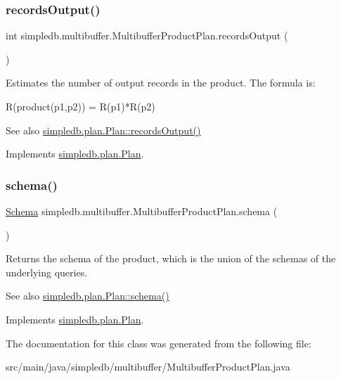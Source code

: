 \subsubsection{\texorpdfstring{records\+Output()}{recordsOutput()}}
{\footnotesize\ttfamily int simpledb.\+multibuffer.\+Multibuffer\+Product\+Plan.\+records\+Output (\begin{DoxyParamCaption}{ }\end{DoxyParamCaption})\hspace{0.3cm}{\ttfamily [inline]}}

Estimates the number of output records in the product. The formula is\+: 
\begin{DoxyPre} R(product(p1,p2)) = R(p1)*R(p2) \end{DoxyPre}
 \begin{DoxySeeAlso}{See also}
\hyperlink{interfacesimpledb_1_1plan_1_1Plan_a187e06657d356c80a7f743d7ff8fd257}{simpledb.\+plan.\+Plan\+::records\+Output()} 
\end{DoxySeeAlso}


Implements \hyperlink{interfacesimpledb_1_1plan_1_1Plan_a187e06657d356c80a7f743d7ff8fd257}{simpledb.\+plan.\+Plan}.

\mbox{\label{classsimpledb_1_1multibuffer_1_1MultibufferProductPlan_a8cc53b6bf91a6d7f28ce76c0c226a93f}} 
\subsubsection{\texorpdfstring{schema()}{schema()}}
{\footnotesize\ttfamily \hyperlink{classsimpledb_1_1record_1_1Schema}{Schema} simpledb.\+multibuffer.\+Multibuffer\+Product\+Plan.\+schema (\begin{DoxyParamCaption}{ }\end{DoxyParamCaption})\hspace{0.3cm}{\ttfamily [inline]}}

Returns the schema of the product, which is the union of the schemas of the underlying queries. \begin{DoxySeeAlso}{See also}
\hyperlink{interfacesimpledb_1_1plan_1_1Plan_ad0ee1aa2c4e7147e9f8fc6f3301fa986}{simpledb.\+plan.\+Plan\+::schema()} 
\end{DoxySeeAlso}


Implements \hyperlink{interfacesimpledb_1_1plan_1_1Plan_ad0ee1aa2c4e7147e9f8fc6f3301fa986}{simpledb.\+plan.\+Plan}.



The documentation for this class was generated from the following file\+:\begin{DoxyCompactItemize}
\item 
src/main/java/simpledb/multibuffer/Multibuffer\+Product\+Plan.\+java\end{DoxyCompactItemize}
